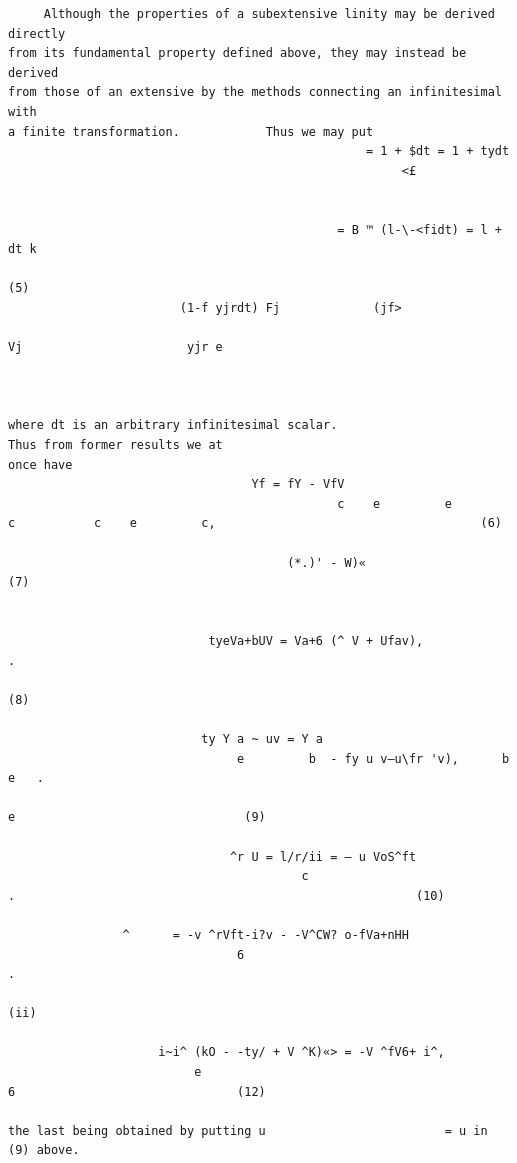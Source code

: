 \documentclass[10pt]{article}
\begin{document}
\begin{verbatim}
     Although the properties of a subextensive linity may be derived directly
from its fundamental property defined above, they may instead be derived
from those of an extensive by the methods connecting an infinitesimal with
a finite transformation.            Thus we may put
                                                  = 1 + $dt = 1 + tydt
                                                       <£


                                              = B ™ (l-\-<fidt) = l + dt k
                                                                                                                                           (5)
                        (1-f yjrdt) Fj             (jf>
                                                                                     Vj                       yjr e



where dt is an arbitrary infinitesimal scalar.                                           Thus from former results we at
once have
                                  Yf = fY - VfV
                                              c    e         e           c           c    e         c,                                     (6)

                                       (*.)' - W)«                                                                                         (7)


                            tyeVa+bUV = Va+6 (^ V + Ufav),                           .
                                                                                                                                           (8)

                           ty Y a ~ uv = Y a
                                e         b  - fy u v—u\fr 'v),      b       e   .
                                                                                                          e                                (9)

                               ^r U = l/r/ii = — u VoS^ft
                                         c                                       .                                                        (10)

                ^      = -v ^rVft-i?v - -V^CW? o-fVa+nHH
                                6                                                                   .
                                                                                                                                          (ii)

                     i~i^ (kO - -ty/ + V ^K)«> = -V ^fV6+ i^,
                          e                                                                               6                               (12)

the last being obtained by putting u                         = u in (9) above.


\end{verbatim}
\end{document}
